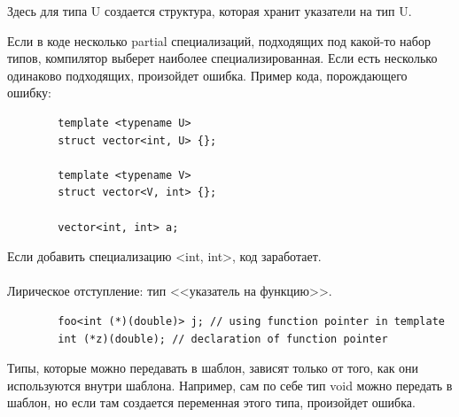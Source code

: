 \documentclass[12pt, a4paper]{article}
\begin{document}
	Здесь для типа U создается структура, которая хранит указатели на тип U.\\
	\par Если в коде несколько partial специализаций, подходящих под какой-то набор типов, компилятор выберет наиболее специализированная. Если есть несколько одинаково подходящих, произойдет ошибка. Пример кода, порождающего ошибку:
	\begin{verbatim}
		template <typename U>
		struct vector<int, U> {};
		
		template <typename V>
		struct vector<V, int> {};
		
		vector<int, int> a;
	\end{verbatim}
	Если добавить специализацию <int, int>, код заработает.\\\\
	Лирическое отступление: тип <<указатель на функцию>>.
	\begin{verbatim}
		foo<int (*)(double)> j; // using function pointer in template
		int (*z)(double); // declaration of function pointer
	\end{verbatim}
	\par Типы, которые можно передавать в шаблон, зависят только от того, как они используются внутри шаблона. Например, сам по себе тип void можно передать в шаблон, но если там создается переменная этого типа, произойдет ошибка.
\end{document}

